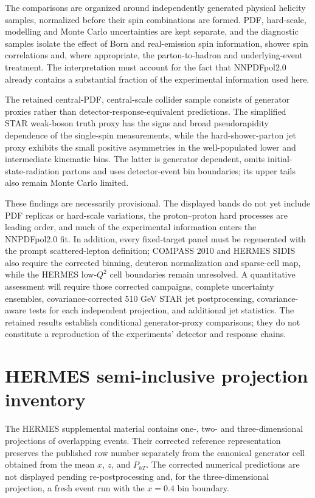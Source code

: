 \documentclass[11pt,a4paper]{article}
\begin{document}
The comparisons are organized around independently generated physical
helicity samples, normalized before their spin combinations are formed.  PDF,
hard-scale, modelling and Monte Carlo uncertainties are kept separate, and
the diagnostic samples isolate the effect of Born and real-emission spin
information, shower spin correlations and, where appropriate, the
parton-to-hadron and underlying-event treatment.  The interpretation must
account for the fact that NNPDFpol2.0 already contains a substantial fraction
of the experimental information used here.

The retained central-PDF, central-scale collider sample consists of
generator proxies rather than detector-response-equivalent predictions.  The
simplified STAR weak-boson truth proxy has the signs and broad
pseudorapidity dependence of the single-spin measurements, while the
hard-shower-parton jet proxy exhibits the small positive asymmetries in the
well-populated lower and intermediate kinematic bins.  The latter is
generator dependent, omits initial-state-radiation partons and uses
detector-event bin boundaries; its upper tails also remain Monte Carlo
limited.

These findings are necessarily provisional.  The displayed bands do not yet
include PDF replicas or hard-scale variations, the proton--proton hard
processes are leading order, and much of the experimental information enters
the NNPDFpol2.0 fit.  In addition, every fixed-target panel must be regenerated
with the prompt scattered-lepton definition; COMPASS 2010 and HERMES SIDIS
also require the corrected binning, deuteron normalization and sparse-cell
map, while the HERMES low-$Q^2$ cell boundaries remain unresolved.  A
quantitative assessment will require those corrected campaigns, complete
uncertainty ensembles, covariance-corrected 510 GeV STAR jet postprocessing,
covariance-aware tests for each independent projection, and additional jet
statistics.  The retained results establish conditional generator-proxy
comparisons; they do not constitute a reproduction of the experiments'
detector and response chains.

\clearpage
\appendix

\section{HERMES semi-inclusive projection inventory}
\label{app:sidis-projections}

The HERMES supplemental material contains one-, two- and
three-dimensional projections of overlapping events.  Their corrected
reference representation preserves the published row number separately from
the canonical generator cell obtained from the mean $x$, $z$, and $P_{hT}$.
The corrected numerical predictions are not displayed pending
re-postprocessing and, for the three-dimensional projection, a fresh event
run with the $x=0.4$ bin boundary.
\end{document}
